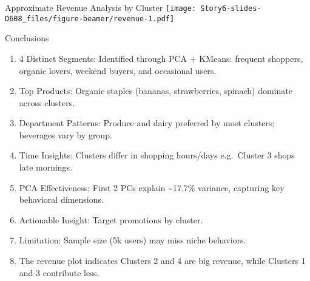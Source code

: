\documentclass[
  ignorenonframetext,
]{beamer}
\providecommand{\tightlist}{%
  \setlength{\itemsep}{0pt}\setlength{\parskip}{0pt}}
\begin{document}
\begin{frame}{Approximate Revenue Analysis by Cluster}
\label{approximate-revenue-analysis-by-cluster}
\texttt{[image: Story6-slides-D608\_files/figure-beamer/revenue-1.pdf]}
\end{frame}

\begin{frame}{Conclusions}
\label{conclusions}
\begin{enumerate}
[1)]
\tightlist
\item
  4 Distinct Segments: Identified through PCA + KMeans: frequent
  shoppers, organic lovers, weekend buyers, and occasional users.
\item
  Top Products: Organic staples (bananas, strawberries, spinach)
  dominate across clusters.
\item
  Department Patterns: Produce and dairy preferred by most clusters;
  beverages vary by group.
\item
  Time Insights: Clusters differ in shopping hours/days e.g.~Cluster 3
  shops late mornings.
\item
  PCA Effectiveness: First 2 PCs explain \textasciitilde17.7\% variance,
  capturing key behavioral dimensions.
\item
  Actionable Insight: Target promotions by cluster.
\item
  Limitation: Sample size (5k users) may miss niche behaviors.
\item
  The revenue plot indicates Clusters 2 and 4 are big revenue, while
  Clusters 1 and 3 contribute less.
\end{enumerate}
\end{frame}
\end{document}

